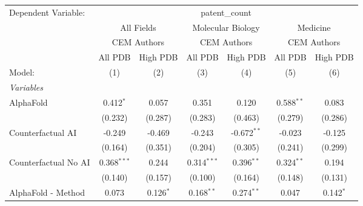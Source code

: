 \begingroup
\centering
\begin{tabular}{lcccccc}
   \tabularnewline \midrule \midrule
   Dependent Variable: & \multicolumn{6}{c}{patent\_count}\\
 & \multicolumn{2}{c}{All Fields} & \multicolumn{2}{c}{Molecular Biology} & \multicolumn{2}{c}{Medicine} \\
\cmidrule(lr){2-3} \cmidrule(lr){4-5} \cmidrule(lr){6-7}
 & \multicolumn{2}{c}{CEM Authors} & \multicolumn{2}{c}{CEM Authors} & \multicolumn{2}{c}{CEM Authors} \\
\cmidrule(lr){2-3} \cmidrule(lr){4-5} \cmidrule(lr){6-7}
 & \multicolumn{1}{c}{All PDB} & \multicolumn{1}{c}{High PDB} & \multicolumn{1}{c}{All PDB} & \multicolumn{1}{c}{High PDB} & \multicolumn{1}{c}{All PDB} & \multicolumn{1}{c}{High PDB} \\
\cmidrule(lr){2-2} \cmidrule(lr){3-3} \cmidrule(lr){4-4} \cmidrule(lr){5-5} \cmidrule(lr){6-6} \cmidrule(lr){7-7}
   Model:                                                     & (1)           & (2)          & (3)            & (4)           & (5)            & (6)\\  
   \midrule
   \emph{Variables}\\
   AlphaFold                                                  & 0.412$^{*}$   & 0.057        & 0.351          & 0.120         & 0.588$^{**}$   & 0.083\\   
                                                              & (0.232)       & (0.287)      & (0.283)        & (0.463)       & (0.279)        & (0.286)\\   
   Counterfactual AI                                          & -0.249        & -0.469       & -0.243         & -0.672$^{**}$ & -0.023         & -0.125\\   
                                                              & (0.164)       & (0.351)      & (0.204)        & (0.305)       & (0.241)        & (0.299)\\   
   Counterfactual No AI                                       & 0.368$^{***}$ & 0.244        & 0.314$^{***}$  & 0.396$^{**}$  & 0.324$^{**}$   & 0.194\\   
                                                              & (0.140)       & (0.157)      & (0.100)        & (0.164)       & (0.148)        & (0.131)\\   
   AlphaFold - Method                                         & 0.073         & 0.126$^{*}$  & 0.168$^{**}$   & 0.274$^{**}$  & 0.047          & 0.142$^{*}$\\   

\end{tabular}
